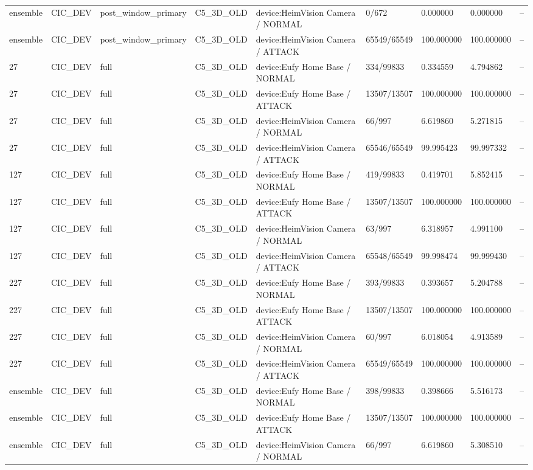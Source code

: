 \begin{tabular}{lllllllll}
ensemble & CIC\_DEV & post\_window\_primary & C5\_3D\_OLD & device:HeimVision Camera / NORMAL & 0/672 & 0.000000 & 0.000000 & -- \\
ensemble & CIC\_DEV & post\_window\_primary & C5\_3D\_OLD & device:HeimVision Camera / ATTACK & 65549/65549 & 100.000000 & 100.000000 & -- \\
27 & CIC\_DEV & full & C5\_3D\_OLD & device:Eufy Home Base / NORMAL & 334/99833 & 0.334559 & 4.794862 & -- \\
27 & CIC\_DEV & full & C5\_3D\_OLD & device:Eufy Home Base / ATTACK & 13507/13507 & 100.000000 & 100.000000 & -- \\
27 & CIC\_DEV & full & C5\_3D\_OLD & device:HeimVision Camera / NORMAL & 66/997 & 6.619860 & 5.271815 & -- \\
27 & CIC\_DEV & full & C5\_3D\_OLD & device:HeimVision Camera / ATTACK & 65546/65549 & 99.995423 & 99.997332 & -- \\
127 & CIC\_DEV & full & C5\_3D\_OLD & device:Eufy Home Base / NORMAL & 419/99833 & 0.419701 & 5.852415 & -- \\
127 & CIC\_DEV & full & C5\_3D\_OLD & device:Eufy Home Base / ATTACK & 13507/13507 & 100.000000 & 100.000000 & -- \\
127 & CIC\_DEV & full & C5\_3D\_OLD & device:HeimVision Camera / NORMAL & 63/997 & 6.318957 & 4.991100 & -- \\
127 & CIC\_DEV & full & C5\_3D\_OLD & device:HeimVision Camera / ATTACK & 65548/65549 & 99.998474 & 99.999430 & -- \\
227 & CIC\_DEV & full & C5\_3D\_OLD & device:Eufy Home Base / NORMAL & 393/99833 & 0.393657 & 5.204788 & -- \\
227 & CIC\_DEV & full & C5\_3D\_OLD & device:Eufy Home Base / ATTACK & 13507/13507 & 100.000000 & 100.000000 & -- \\
227 & CIC\_DEV & full & C5\_3D\_OLD & device:HeimVision Camera / NORMAL & 60/997 & 6.018054 & 4.913589 & -- \\
227 & CIC\_DEV & full & C5\_3D\_OLD & device:HeimVision Camera / ATTACK & 65549/65549 & 100.000000 & 100.000000 & -- \\
ensemble & CIC\_DEV & full & C5\_3D\_OLD & device:Eufy Home Base / NORMAL & 398/99833 & 0.398666 & 5.516173 & -- \\
ensemble & CIC\_DEV & full & C5\_3D\_OLD & device:Eufy Home Base / ATTACK & 13507/13507 & 100.000000 & 100.000000 & -- \\
ensemble & CIC\_DEV & full & C5\_3D\_OLD & device:HeimVision Camera / NORMAL & 66/997 & 6.619860 & 5.308510 & -- \\

\end{tabular}
